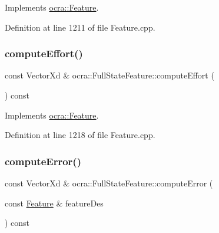 Implements \hyperlink{classocra_1_1Feature_a19626a241666fdae253af1f7b6f2acd7}{ocra\+::\+Feature}.



Definition at line 1211 of file Feature.\+cpp.

\hypertarget{classocra_1_1FullStateFeature_a65b58a3fac72eab7f9bd18cb20775798}{}\label{classocra_1_1FullStateFeature_a65b58a3fac72eab7f9bd18cb20775798} 
\subsubsection{\texorpdfstring{compute\+Effort()}{computeEffort()}\hspace{0.1cm}{\footnotesize\ttfamily [2/2]}}
{\footnotesize\ttfamily const Vector\+Xd \& ocra\+::\+Full\+State\+Feature\+::compute\+Effort (\begin{DoxyParamCaption}{ }\end{DoxyParamCaption}) const\hspace{0.3cm}{\ttfamily [virtual]}}



Implements \hyperlink{classocra_1_1Feature_ae43f2ffc54862d6ddc0b02fd39431eb6}{ocra\+::\+Feature}.



Definition at line 1218 of file Feature.\+cpp.

\hypertarget{classocra_1_1FullStateFeature_ab1b5ffc62eba180926f7b90e6318ee6f}{}\label{classocra_1_1FullStateFeature_ab1b5ffc62eba180926f7b90e6318ee6f} 
\subsubsection{\texorpdfstring{compute\+Error()}{computeError()}\hspace{0.1cm}{\footnotesize\ttfamily [1/2]}}
{\footnotesize\ttfamily const Vector\+Xd \& ocra\+::\+Full\+State\+Feature\+::compute\+Error (\begin{DoxyParamCaption}\item[{const \hyperlink{classocra_1_1Feature}{Feature} \&}]{feature\+Des }\end{DoxyParamCaption}) const\hspace{0.3cm}{\ttfamily [virtual]}}



